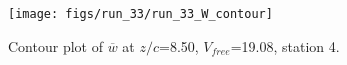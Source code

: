 \begin{figure}[H]
\centering
\texttt{[image: figs/run\_33/run\_33\_W\_contour]}
\caption{Contour plot of $\overline{w}$ at $z/c$=8.50, $V_{free}$=19.08, station 4.}
\label{fig:run_33_W_contour}
\end{figure}


